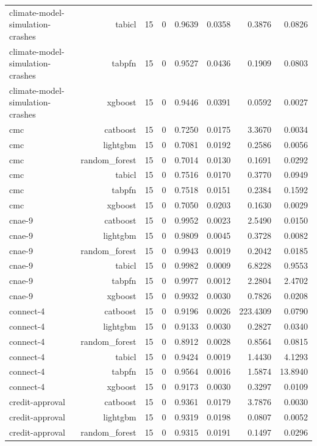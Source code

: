 \begin{table}[htbp]
\begin{tabular}{lrrrrrrr}
climate-model-simulation-crashes & tabicl & 15 & 0 & 0.9639 & 0.0358 & 0.3876 & 0.0826 \\
climate-model-simulation-crashes & tabpfn & 15 & 0 & 0.9527 & 0.0436 & 0.1909 & 0.0803 \\
climate-model-simulation-crashes & xgboost & 15 & 0 & 0.9446 & 0.0391 & 0.0592 & 0.0027 \\
cmc & catboost & 15 & 0 & 0.7250 & 0.0175 & 3.3670 & 0.0034 \\
cmc & lightgbm & 15 & 0 & 0.7081 & 0.0192 & 0.2586 & 0.0056 \\
cmc & random\_forest & 15 & 0 & 0.7014 & 0.0130 & 0.1691 & 0.0292 \\
cmc & tabicl & 15 & 0 & 0.7516 & 0.0170 & 0.3770 & 0.0949 \\
cmc & tabpfn & 15 & 0 & 0.7518 & 0.0151 & 0.2384 & 0.1592 \\
cmc & xgboost & 15 & 0 & 0.7050 & 0.0203 & 0.1630 & 0.0029 \\
cnae-9 & catboost & 15 & 0 & 0.9952 & 0.0023 & 2.5490 & 0.0150 \\
cnae-9 & lightgbm & 15 & 0 & 0.9809 & 0.0045 & 0.3728 & 0.0082 \\
cnae-9 & random\_forest & 15 & 0 & 0.9943 & 0.0019 & 0.2042 & 0.0185 \\
cnae-9 & tabicl & 15 & 0 & 0.9982 & 0.0009 & 6.8228 & 0.9553 \\
cnae-9 & tabpfn & 15 & 0 & 0.9977 & 0.0012 & 2.2804 & 2.4702 \\
cnae-9 & xgboost & 15 & 0 & 0.9932 & 0.0030 & 0.7826 & 0.0208 \\
connect-4 & catboost & 15 & 0 & 0.9196 & 0.0026 & 223.4309 & 0.0790 \\
connect-4 & lightgbm & 15 & 0 & 0.9133 & 0.0030 & 0.2827 & 0.0340 \\
connect-4 & random\_forest & 15 & 0 & 0.8912 & 0.0028 & 0.8564 & 0.0815 \\
connect-4 & tabicl & 15 & 0 & 0.9424 & 0.0019 & 1.4430 & 4.1293 \\
connect-4 & tabpfn & 15 & 0 & 0.9564 & 0.0016 & 1.5874 & 13.8940 \\
connect-4 & xgboost & 15 & 0 & 0.9173 & 0.0030 & 0.3297 & 0.0109 \\
credit-approval & catboost & 15 & 0 & 0.9361 & 0.0179 & 3.7876 & 0.0030 \\
credit-approval & lightgbm & 15 & 0 & 0.9319 & 0.0198 & 0.0807 & 0.0052 \\
credit-approval & random\_forest & 15 & 0 & 0.9315 & 0.0191 & 0.1497 & 0.0296 \\

\end{tabular}
\end{table}
